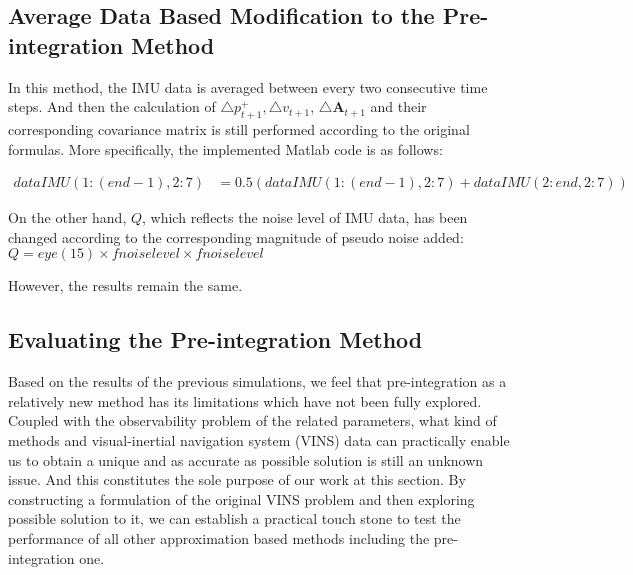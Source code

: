 \documentclass[12pt]{article}   %
\begin{document}

\subsection{Average Data Based Modification to the Pre-integration Method}

In this method, the IMU data is averaged between every two consecutive time steps. And then the calculation of $\triangle p_{t+1}^+, \triangle v_{t+1}$, $\triangle \textbf{A} _{t+1}$ and their corresponding covariance matrix  is still performed according to the original formulas. More specifically, the implemented Matlab code is as follows:

\begin{align*}
dataIMU(1:(end-1), 2:7) & = 0.5 (dataIMU(1:(end-1), 2:7) + dataIMU(2:end, 2:7)) 
\end{align*}

On the other hand, $Q$, which reflects the noise level of IMU data, has been changed according to the corresponding magnitude of pseudo noise added: $Q = eye(15) \times fnoiselevel \times fnoiselevel$

\noindent However, the results remain the same.

\subsection{Evaluating the Pre-integration Method}


Based on the results of the previous simulations, we feel that pre-integration as a relatively new method has its limitations which have not been fully explored. Coupled with the observability problem of the related parameters, what kind of methods and visual-inertial navigation system (VINS) data can practically enable us to obtain a unique and as accurate as possible solution is still an unknown issue. And this constitutes the sole purpose of our work at this section. By constructing a formulation of the original VINS problem and then exploring possible solution to it, we can establish a practical touch stone to test the performance of all other approximation based methods including the pre-integration one.
\end{document}
